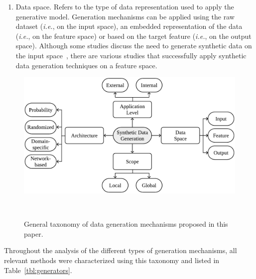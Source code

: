 \documentclass[parskip=full]{scrartcl}
\begin{document}
\begin{enumerate}
    \item Data space. Refers to the type of data representation used to apply
        the generative model. Generation mechanisms can be applied using the
        raw dataset (\textit{i.e.}, on the input space), an embedded
        representation of the data (\textit{i.e.}, on the feature space) or
        based on the target feature (\textit{i.e.}, on the output space).
        Although some studies discuss the need to generate synthetic data on
        the input space~\cite{dankar2021fake, patki2016synthetic}, there are
        various studies that successfully apply synthetic data generation
        techniques on a feature space.

\end{enumerate}

\begin{figure}
	\centering
	\includegraphics[width=.8\linewidth]{../analysis/data-generation-taxonomy}
    \caption{General taxonomy of data generation mechanisms proposed in this
        paper.
    }~\label{fig:data-generation-taxonomy}
\end{figure}

Throughout the analysis of the different types of generation mechanisms, all
relevant methods were characterized using this taxonomy and listed in
Table~\ref{tbl:generators}.
\end{document}
